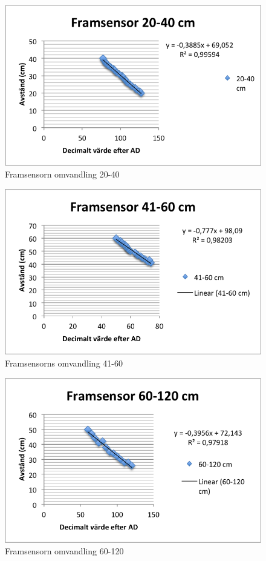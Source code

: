 \begin{figure}[H]
  \centering
 \includegraphics[angle=0,scale=1]{bilder/F_20_40.png}
  \caption{Framsensorn omvandling 20-40}
\end{figure}

\begin{figure}[H]
  \centering
 \includegraphics[angle=0,scale=1]{bilder/F_41_60.png}
  \caption{Framsensorns omvandling 41-60}
\end{figure}

\begin{figure}[H]
  \centering
 \includegraphics[angle=0,scale=1]{bilder/F_60_120.png}
  \caption{Framsensorn omvandling 60-120}
\end{figure}


